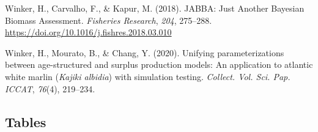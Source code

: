 \documentclass[
  11pt,
]{SCreport}
\newlength{\cslhangindent}
\newenvironment{CSLReferences}[2] %
 {\begin{list}{}{%
  \setlength{\itemindent}{0pt}
  \setlength{\leftmargin}{0pt}
  \setlength{\parsep}{0pt}
  \ifodd #1
   \setlength{\leftmargin}{\cslhangindent}
   \setlength{\itemindent}{-1\cslhangindent}
  \fi
  \setlength{\itemsep}{#2\baselineskip}}}
 {\end{list}}
\begin{document}
\begin{CSLReferences}{1}{0}
Winker, H., Carvalho, F., \& Kapur, M. (2018). {JABBA}: {Just} {Another}
{Bayesian} {Biomass} {Assessment}. \emph{Fisheries Research},
\emph{204}, 275--288.
\url{https://doi.org/10.1016/j.fishres.2018.03.010}

Winker, H., Mourato, B., \& Chang, Y. (2020). Unifying parameterizations
between age-structured and surplus production models: {An} application
to atlantic white marlin (\emph{{Kajiki} albidia}) with simulation
testing. \emph{Collect. Vol. Sci. Pap. ICCAT}, \emph{76}(4), 219--234.

\end{CSLReferences}

\newpage

\begin{landscape}

\section{Tables}\label{sec-tables}


\end{landscape}
\end{document}
